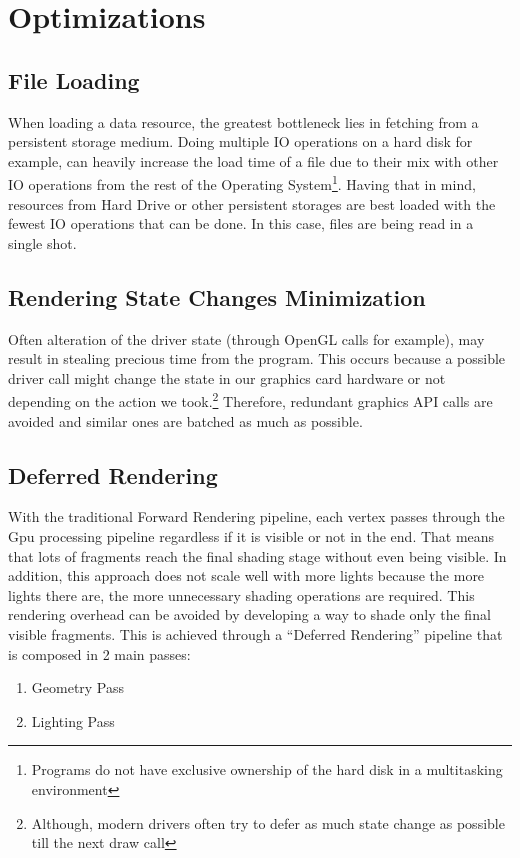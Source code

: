 \section{Optimizations}

\subsection{File Loading}
When loading a data resource, the greatest bottleneck lies in fetching from a persistent storage medium.
Doing multiple IO operations on a hard disk for example, can heavily increase the load time of a file
due to their mix with other IO operations from the rest of the Operating System\footnote{Programs do
not have exclusive ownership of the hard disk in a multitasking environment}. Having that in mind, resources
from Hard Drive or other persistent storages are best loaded with the fewest IO operations that can be done.
In this case, files are being read in a single shot.

\subsection{Rendering State Changes Minimization}
Often alteration of the driver state (through OpenGL calls for example), may result in stealing precious time
from the program. This occurs because a possible driver call might change the state in our graphics card hardware
or not depending on the action we took.\footnote{Although, modern drivers often try to defer as much state change as
possible till the next draw call} Therefore, redundant graphics API calls are avoided and similar ones are batched
as much as possible.

\subsection{Deferred Rendering}
With the traditional Forward Rendering pipeline, each vertex passes through the Gpu processing pipeline regardless
if it is visible or not in the end. That means that lots of fragments reach the final shading stage without even
being visible. In addition, this approach does not scale well with more lights because the more lights there are,
the more unnecessary shading operations are required. This rendering overhead can be avoided by developing a way
to shade only the final visible fragments. This is achieved through a ``Deferred Rendering'' pipeline that is
composed in 2 main passes:

\begin{enumerate}
\item Geometry Pass
\item Lighting Pass
\end{enumerate}

